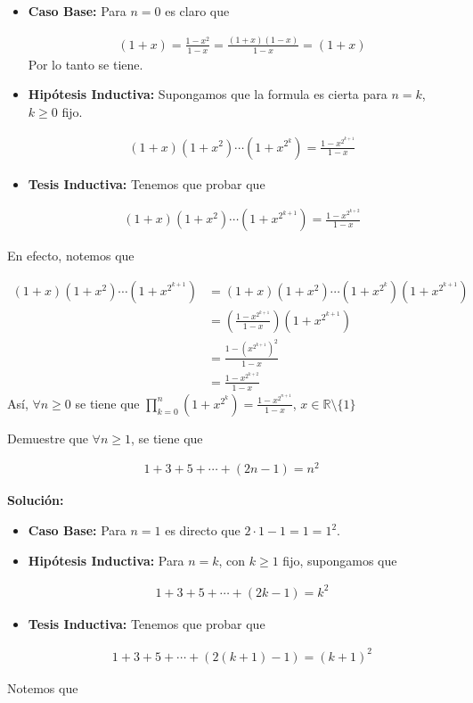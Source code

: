 \documentclass[12pt]{book}
\begin{document}
\begin{itemize}
    \item \textbf{Caso Base:} Para $n=0$ es claro que 

    \begin{align*}
        (1+x)=\frac{1-x^{2}}{1-x}=\frac{(1+x)(1-x)}{1-x}=(1+x)
    \end{align*}
Por lo tanto se tiene.
    \item \textbf{Hipótesis Inductiva:} Supongamos que la formula es cierta para $n=k$, $k\geq 0 $ fijo. 

    \begin{align*}
        (1+x)(1+x^2)\cdots(1+x^{2^k})=\frac{1-x^{2^{k+1}}}{1-x}
    \end{align*}

    \item \textbf{Tesis Inductiva:} Tenemos que probar que 

    \begin{align*}
         (1+x)(1+x^2)\cdots(1+x^{2^{k+1}})=\frac{1-x^{2^{k+2}}}{1-x}
    \end{align*}
\end{itemize}
En efecto, notemos que 

\begin{align*}
     (1+x)(1+x^2)\cdots(1+x^{2^{k+1}})&=(1+x)(1+x^2)\cdots(1+x^{2^{k}})(1+x^{2^{k+1}}) \\
     &=\left(\frac{1-x^{2^{k+1}}}{1-x}\right)(1+x^{2^{k+1}}) \\
     &=\frac{1-\left(x^{2^{k+1}}\right)^2}{1-x} \\
     &=\frac{1-x^{2^{k+2}}}{1-x}
\end{align*}
Así, $\forall n \geq 0 $ se tiene que $\displaystyle \prod_{k=0}^n(1+x^{2^k})=\frac{1-x^{2^{n+1}}}{1-x}$, $ x \in \mathbb{R}\setminus\{1\}$

\begin{prob}{}{}
Demuestre que $\forall n \geq 1 $, se tiene que 

\begin{align*}
    1+3+5+\cdots + (2n-1)=n^2
\end{align*}
\end{prob}
\textbf{Solución:}
\begin{itemize}
    \item \textbf{Caso Base:} Para $n=1$ es directo que $2\cdot1-1=1=1^2$. 

    \item \textbf{Hipótesis Inductiva:} Para $n=k$, con $k\geq 1$ fijo, supongamos que 

    \begin{align*}
         1+3+5+\cdots + (2k-1)=k^2
    \end{align*}

    \item \textbf{Tesis Inductiva:} Tenemos que probar que

    \begin{align*}
         1+3+5+\cdots + (2(k+1)-1)=(k+1)^2
    \end{align*}
\end{itemize}
Notemos que 
\end{document}
